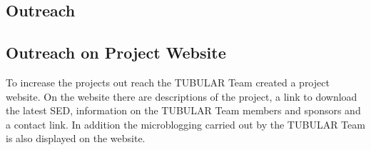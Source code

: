 \documentclass[a4paper,12pt,twoside]{article}
\begin{document}
\renewcommand{\refname}{}


\pagebreak
\begin{appendices}
\newpage





\section{Outreach} \label{sec:appE}

\subsection{Outreach on Project Website}

To increase the projects out reach the TUBULAR Team created a project website. On the website there are descriptions of the project, a link to download the latest SED, information on the TUBULAR Team members and sponsors and a contact link. In addition the microblogging carried out by the TUBULAR Team is also displayed on the website.


\end{appendices}
\end{document}
